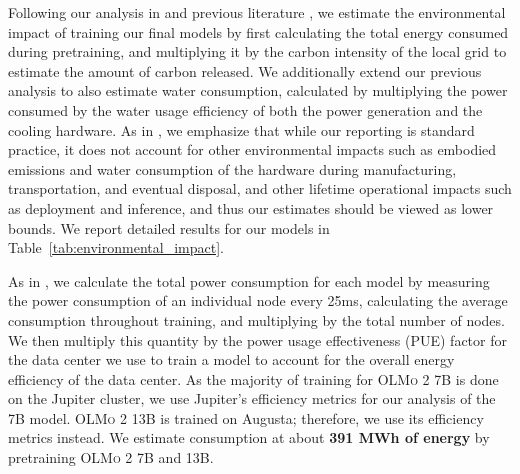 \documentclass[table]{ai2style/ai2}
\newcommand{\olmotoo}{\textsc{OLMo 2}\xspace}
\begin{document}
Following our analysis in \citet{Groeneveld2024OLMoAT} and previous literature \citep{patterson2021carbonemissionslargeneural,dodge2022measuringcarbonintensityai,luccioni2022estimatingcarbonfootprintbloom,li2023makingaithirstyuncovering}, we estimate the environmental impact of training our final models by first calculating the total energy consumed during pretraining, and multiplying it by the carbon intensity of the local grid to estimate the amount of carbon released. We additionally extend our previous analysis to also estimate water consumption, calculated by multiplying the power consumed by the water usage efficiency of both the power generation and the cooling hardware. As in \citet{Groeneveld2024OLMoAT}, we emphasize that while our reporting is standard practice, it does not account for other environmental impacts such as embodied emissions and water consumption of the hardware during manufacturing, transportation, and eventual disposal, and other lifetime operational impacts such as deployment and inference, and thus our estimates should be viewed as lower bounds. We report detailed results for our models in Table~\ref{tab:environmental_impact}.

As in \citet{Groeneveld2024OLMoAT}, we calculate the total power consumption for each model by measuring the power consumption of an individual node every 25ms, calculating the average consumption throughout training, and multiplying by the total number of nodes. 
We then multiply this quantity by the power usage effectiveness (PUE) factor for the data center we use to train a model to account for the overall energy efficiency of the data center. 
As the majority of training for \olmotoo 7B is done on the Jupiter cluster, we use Jupiter's efficiency metrics for our analysis of the 7B model.
\olmotoo 13B is trained on Augusta; therefore, we use its efficiency metrics instead.
We estimate consumption at about \textbf{391 MWh of energy} by pretraining \olmotoo 7B and 13B.
\end{document}
